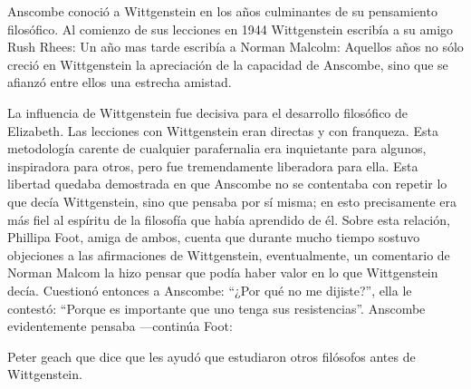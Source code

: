 Anscombe conoció a Wittgenstein en los años culminantes de su pensamiento
     filosófico. 
     Al comienzo de sus lecciones en 1944 Wittgenstein escribía a su amigo Rush Rhees:
     Un año mas tarde escribía a Norman Malcolm:
     Aquellos años no sólo creció en Wittgenstein la apreciación de la capacidad de
     Anscombe, sino que se afianzó entre ellos una estrecha amistad. 

     La influencia de Wittgenstein fue decisiva para el desarrollo filosófico de
     Elizabeth. Las lecciones con Wittgenstein eran directas y con franqueza. Esta
     metodología carente de cualquier parafernalia era inquietante para algunos,
     inspiradora para otros, pero fue tremendamente liberadora para
     ella.\autocite[loc 9853 Chapter 4, Section 24, \S5]{monk} Esta libertad
     quedaba demostrada en que Anscombe no se contentaba con repetir lo que decía
     Wittgenstein, sino que pensaba por sí misma; en esto precisamente era más fiel
     al espíritu de la filosofía que había aprendido de él. Sobre esta relación,
     Phillipa Foot, amiga de ambos, cuenta que durante mucho tiempo sostuvo
     objeciones a las afirmaciones de Wittgenstein, eventualmente, un comentario de
     Norman Malcom la hizo pensar que podía haber valor en lo que Wittgenstein decía.
     Cuestionó entonces a Anscombe: 
     ``¿Por qué no me dijiste?'', ella le contestó: ``Porque es importante que uno
     tenga sus resistencias''. Anscombe evidentemente pensaba ---continúa Foot: 

     Peter geach que dice que les ayudó que estudiaron otros filósofos antes de
     Wittgenstein.

